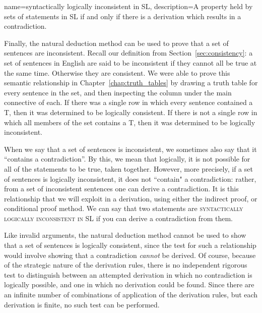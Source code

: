 {
{
name=syntactically logically inconsistent in SL,
description={A property held by sets of statements in SL if and only if there is a derivation which results in a contradiction.}
}

Finally, the natural deduction method can be used to prove that a set of sentences are inconsistent. Recall our definition from
Section~\ref{sec:consistency}: a set of sentences in English are said to be inconsistent if they cannot all be true at the same time. Otherwise
they are consistent. 
We were able to prove this semantic relationship in Chapter~\ref{chap:truth_tables} by drawing a truth table for
every sentence in the set, and then inspecting the column under the main connective of each. If there was a single row in which every sentence
contained a T, then it was determined to be logically consistent. If there is not a single row in which all members of the set contains a T, then it was
determined to be logically inconsistent.

When we say that a set of sentences is inconsistent, we sometimes also say that it ``contains a contradiction''. By this, we mean that logically, it is not possible for all of the
statements to be true, taken together. However, more precisely, if a set of sentences is logically inconsistent, it does not ``contain" a contradiction: rather, from a set of inconsistent
sentences one can derive a contradiction. It is this relationship that we will exploit in a derivation, using either the indirect proof, or conditional proof method. We can say that two
statements are \textsc{\gls{syntactically logically inconsistent in SL}} \label{def:syntactically_logically_inconsistent_in_sl} if you can derive a contradiction from them.



Like invalid arguments, the natural deduction method cannot be used to show that a set of sentences is logically consistent, since the test for such a relationship
would involve showing that a contradiction \emph{cannot} be derived. Of course, because of the strategic nature of the derivation rules, there is no independent
rigorous test to distinguish between an attempted derivation in which no contradiction is logically possible, and one in which no derivation could be found.
Since there are an infinite number of combinations of application of the derivation rules, but each derivation is finite, no such test can be performed.

}
